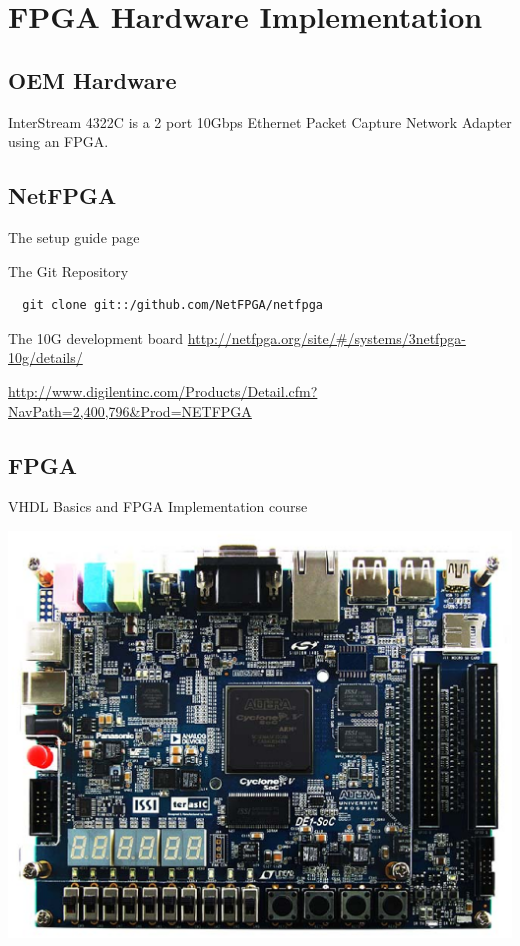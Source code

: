 \chapter{FPGA Hardware Implementation}
\section{OEM Hardware}
InterStream 4322C\cite{21} 
is a 2 port 10Gbps Ethernet Packet Capture Network Adapter
using an FPGA.

\section{NetFPGA}

The setup guide page\cite{22}

The Git Repository\cite{23}
\begin{verbatim}
  git clone git::/github.com/NetFPGA/netfpga
\end{verbatim}

The 10G development board\cite{24}
\url{http://netfpga.org/site/#/systems/3netfpga-10g/details/}

\url{http://www.digilentinc.com/Products/Detail.cfm?NavPath=2,400,796&Prod=NETFPGA}

\section{FPGA}
VHDL Basics and FPGA Implementation course

\begin{center}
\includegraphics[scale=0.5]{eps/DE1SoC.eps}
\vskip 0.1in
\end{center}

